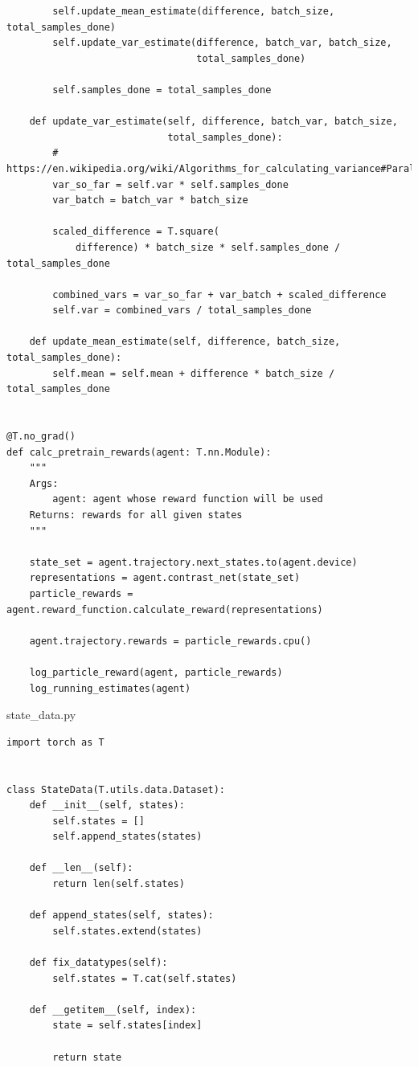 \documentclass{article}
\begin{document}
\begin{lstlisting}
        self.update_mean_estimate(difference, batch_size, total_samples_done)
        self.update_var_estimate(difference, batch_var, batch_size,
                                 total_samples_done)

        self.samples_done = total_samples_done

    def update_var_estimate(self, difference, batch_var, batch_size,
                            total_samples_done):
        # https://en.wikipedia.org/wiki/Algorithms_for_calculating_variance#Parallel_algorithm
        var_so_far = self.var * self.samples_done
        var_batch = batch_var * batch_size

        scaled_difference = T.square(
            difference) * batch_size * self.samples_done / total_samples_done

        combined_vars = var_so_far + var_batch + scaled_difference
        self.var = combined_vars / total_samples_done

    def update_mean_estimate(self, difference, batch_size, total_samples_done):
        self.mean = self.mean + difference * batch_size / total_samples_done


@T.no_grad()
def calc_pretrain_rewards(agent: T.nn.Module):
    """
    Args:
        agent: agent whose reward function will be used
    Returns: rewards for all given states
    """

    state_set = agent.trajectory.next_states.to(agent.device)
    representations = agent.contrast_net(state_set)
    particle_rewards = agent.reward_function.calculate_reward(representations)

    agent.trajectory.rewards = particle_rewards.cpu()

    log_particle_reward(agent, particle_rewards)
    log_running_estimates(agent)
\end{lstlisting}
\newpage

state\_data.py
\begin{lstlisting}
import torch as T


class StateData(T.utils.data.Dataset):
    def __init__(self, states):
        self.states = []
        self.append_states(states)

    def __len__(self):
        return len(self.states)

    def append_states(self, states):
        self.states.extend(states)

    def fix_datatypes(self):
        self.states = T.cat(self.states)

    def __getitem__(self, index):
        state = self.states[index]

        return state
\end{lstlisting}
\newpage
\end{document}
